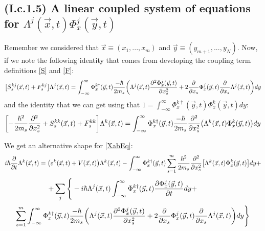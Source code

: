 \documentclass[11pt, a4paper]{article} %
\begin{document}
\subsection*{(I.c.1.5) A linear coupled system of equations for $\Lambda^j(\vec{x},t) \Phi^j_x(\vec{y},t)$ }
\vspace{-0.3cm}

Remember we considered that $\vec{x}\equiv (x_1,...,x_m)$ and $\vec{y}\equiv (y_{m+1},...,y_N)$. Now, if we note the following identity that comes from developing the coupling term definitions \eqref{S} and \eqref{F}:
\begin{equation}
\qty[S^{kj}_s(\vec{x},t)+F_s^{kj}]\Lambda^j(\vec{x},t)=\int_{-\infty}^\infty \Phi^{k\dagger}_x(\vec{y},t) \frac{-\hbar}{2m_s}\qty( \Lambda^j(\vec{x},t)\pdv[2]{\Phi^j_x(\vec{y},t)}{x_s}+2\pdv{}{x_s}\Phi^j_x(\vec{y},t)\pdv{}{x_s}\Lambda^j(\vec{x},t) ) dy
\end{equation}
and the identity that we can get using that $1=\int_{-\infty}^\infty \Phi^{k\dagger}_x(\vec{y},t) \Phi^k_x(\vec{y},t)dy$:
\begin{equation}
\qty[-\frac{\hbar^2}{2m_s}\pdv[2]{}{x_s}+S^{kk}_s(\vec{x},t)+F_s^{kk}]\Lambda^k(\vec{x},t)=\int_{-\infty}^\infty \Phi^{k\dagger}_x(\vec{y},t) \frac{-\hbar}{2m_s} \pdv[2]{}{x_s}\qty(\Lambda^k(\vec{x},t)\Phi^k_x(\vec{y},t))dy
\end{equation}

We get an alternative shape for \eqref{XabEq}:
\begin{equation}
i\hbar \pdv{}{t}\Lambda^k(\vec{x},t)=\qty( \varepsilon^k(\vec{x},t)+V(\vec{x},t) )\Lambda^k(\vec{x},t) -\int_{-\infty}^\infty \Phi^{k\dagger}_x(\vec{y},t) \sum_{s=1}^m\frac{\hbar^2}{2m_s}\pdv[2]{}{x_s}\qty[\Lambda^k(\vec{x},t)\Phi^k_x(\vec{y},t) ]dy+
\end{equation}
$$
\hspace*{-1cm}
    +\sum_j\Bigg\{-i\hbar \Lambda^j(\vec{x},t)\int_{-\infty}^\infty \Phi^{k\dagger}_x(\vec{y},t)\pdv{\Phi^j_x(\vec{y},t)}{t}dy+
$$
$$
\sum_{s=1}^m\int_{-\infty}^\infty \Phi^{k\dagger}_x(\vec{y},t) \frac{-\hbar}{2m_s}\qty( \Lambda^j(\vec{x},t)\pdv[2]{\Phi^j_x(\vec{y},t)}{x_s}+2\pdv{}{x_s}\Phi^j_x(\vec{y},t)\pdv{}{x_s}\Lambda^j(\vec{x},t) ) dy\Bigg\}
$$
\end{document}
